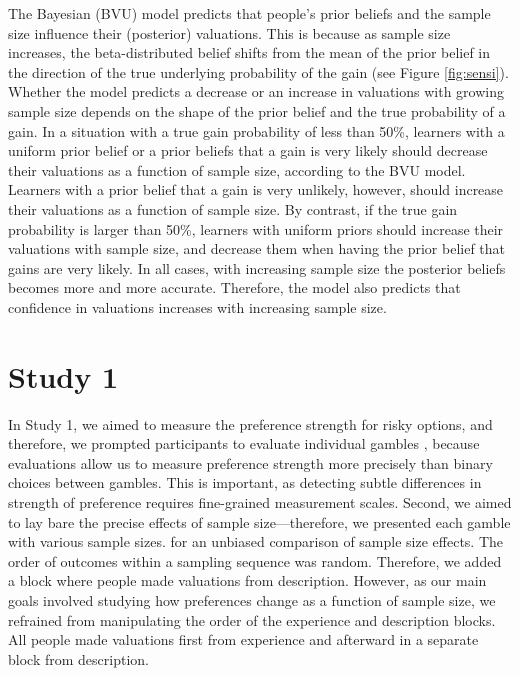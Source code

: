 \documentclass[a4paper, man, natbib, floatsintext]{apa6}
\begin{document}
The Bayesian (BVU) model predicts that people's prior beliefs and the sample size influence their (posterior) valuations. This is because as sample size increases, the beta-distributed belief shifts from the mean of the prior belief in the direction of the true underlying probability of the gain (see Figure \ref{fig:sensi}). Whether the model predicts a decrease or an increase in valuations with growing sample size depends on the shape of the prior belief and the true probability of a gain. In a situation with a true gain probability of less than 50\%, learners with a uniform prior belief or a prior beliefs that a gain is very likely should decrease their valuations as a function of sample size, according to the BVU model. Learners with a prior belief that a gain is very unlikely, however, should increase their valuations as a function of sample size. By contrast, if the true gain probability is larger than 50\%, learners with uniform priors should increase their valuations with sample size, and decrease them when having the prior belief that gains are very likely. In all cases, with increasing sample size the posterior beliefs becomes more and more accurate. Therefore, the model also predicts that confidence in valuations increases with increasing sample size. %


\section{Study 1}
In Study 1, we aimed to measure the preference strength for risky options, and therefore, we prompted participants to evaluate individual gambles \citep[similer to e.g.,][]{Ashby2014, Golan2014, Pachur2012}, because evaluations allow us to measure preference strength more precisely than binary choices between gambles. This is important, as detecting subtle differences in strength of preference requires fine-grained measurement scales.  Second, we aimed to lay bare the precise effects of sample size---therefore, we presented each gamble with various sample sizes.  for an unbiased comparison of sample size effects. The order of outcomes within a sampling sequence was random.  Therefore, we added a block where people made valuations from description. However, as our main goals involved studying how preferences change as a function of sample size, we refrained from manipulating the order of the experience and description blocks. All people made valuations first from experience and afterward in a separate block from description. 
\end{document}
